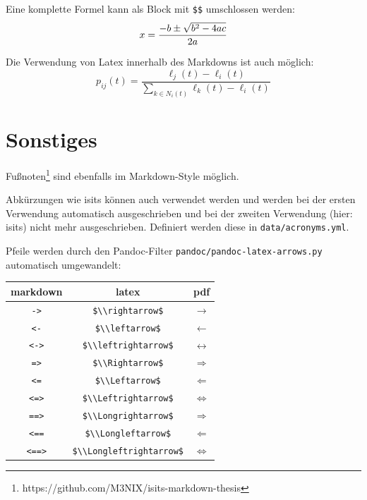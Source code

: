 \documentclass[
  11pt,
  a4paper,
  openright,
  cleardoublepage=plain,
  parskip=half+, %
]{scrreprt}
\newcommand{\passthrough}[1]{#1}
\begin{document}
Eine komplette Formel kann als Block mit \passthrough{\lstinline!$$!}
umschlossen werden: \[
x = {-b \pm \sqrt{b^2-4ac} \over 2a}
\]

Die Verwendung von Latex innerhalb des Markdowns ist auch möglich:
\begin{equation}\label{eq:neighbor-propability}
    p_{ij}(t) = \frac{\ell_j(t) - \ell_i(t)}{\sum_{k \in N_i(t)}^{} \ell_k(t) - \ell_i(t)}
\end{equation}

\hypertarget{sonstiges}{%
\section{Sonstiges}\label{sonstiges}}

Fußnoten\footnote{https://github.com/M3NIX/isits-markdown-thesis} sind
ebenfalls im Markdown-Style möglich.

Abkürzungen wie \ac{isits} können auch verwendet werden und werden bei
der ersten Verwendung automatisch ausgeschrieben und bei der zweiten
Verwendung (hier: \ac{isits}) nicht mehr ausgeschrieben. Definiert
werden diese in \passthrough{\lstinline!data/acronyms.yml!}.

Pfeile werden durch den Pandoc-Filter
\passthrough{\lstinline!pandoc/pandoc-latex-arrows.py!} automatisch
umgewandelt:

\begin{longtable}[]{@{}ccc@{}}
\toprule()
markdown & latex & pdf \\
\midrule()
\endhead
\passthrough{\lstinline!->!} & \passthrough{\lstinline!$\\rightarrow$!}
& $\rightarrow$ \\
\passthrough{\lstinline!<-!} & \passthrough{\lstinline!$\\leftarrow$!} &
$\leftarrow$ \\
\passthrough{\lstinline!<->!} &
\passthrough{\lstinline!$\\leftrightarrow$!} & $\leftrightarrow$ \\
\passthrough{\lstinline!=>!} & \passthrough{\lstinline!$\\Rightarrow$!}
& $\Rightarrow$ \\
\passthrough{\lstinline!<=!} & \passthrough{\lstinline!$\\Leftarrow$!} &
$\Leftarrow$ \\
\passthrough{\lstinline!<=>!} &
\passthrough{\lstinline!$\\Leftrightarrow$!} & $\Leftrightarrow$ \\
\passthrough{\lstinline!==>!} &
\passthrough{\lstinline!$\\Longrightarrow$!} & $\Longrightarrow$ \\
\passthrough{\lstinline!<==!} &
\passthrough{\lstinline!$\\Longleftarrow$!} & $\Longleftarrow$ \\
\passthrough{\lstinline!<==>!} &
\passthrough{\lstinline!$\\Longleftrightarrow$!} &
$\Longleftrightarrow$ \\
\bottomrule()
\end{longtable}
\end{document}

